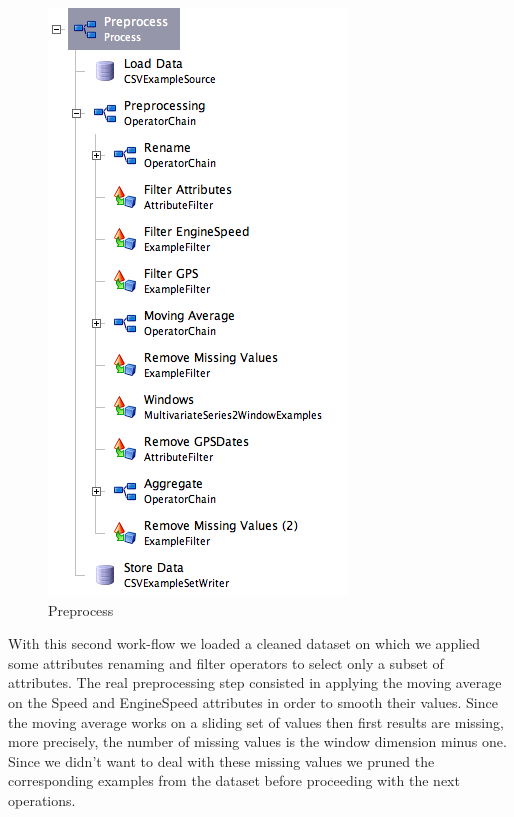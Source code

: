 \begin{figure}[h!]
\centerline{\includegraphics[scale=0.7]{images/preprocess.png}}
\caption{Preprocess}
\label{figure:preprocess}
\end{figure}

With this second work-flow we loaded a cleaned dataset on which we applied some attributes renaming and filter operators to select only a subset of attributes.
The real preprocessing step consisted in applying the moving average on the Speed and EngineSpeed attributes in order to smooth their values. Since the moving average works on a sliding set of values then first results are missing, more precisely, the number of missing values is the window dimension minus one. Since we didn't want to deal with these missing values we pruned the corresponding examples from the dataset before proceeding with the next operations.

